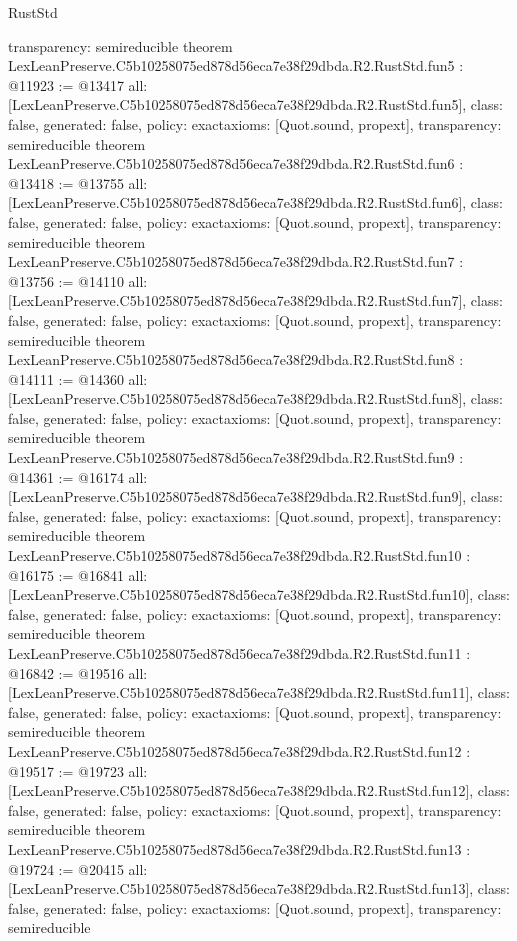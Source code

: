 \begin{lexlean}{RustStd}
\begin{coremodule}
{  transparency: semireducible
}
theorem LexLeanPreserve.C5b10258075ed878d56eca7e38f29dbda.R2.RustStd.fun5 : @11923 := @13417 {
  all: [LexLeanPreserve.C5b10258075ed878d56eca7e38f29dbda.R2.RustStd.fun5],
  class: false,
  generated: false,
  policy: exact{axioms: [Quot.sound, propext]},
  transparency: semireducible
}
theorem LexLeanPreserve.C5b10258075ed878d56eca7e38f29dbda.R2.RustStd.fun6 : @13418 := @13755 {
  all: [LexLeanPreserve.C5b10258075ed878d56eca7e38f29dbda.R2.RustStd.fun6],
  class: false,
  generated: false,
  policy: exact{axioms: [Quot.sound, propext]},
  transparency: semireducible
}
theorem LexLeanPreserve.C5b10258075ed878d56eca7e38f29dbda.R2.RustStd.fun7 : @13756 := @14110 {
  all: [LexLeanPreserve.C5b10258075ed878d56eca7e38f29dbda.R2.RustStd.fun7],
  class: false,
  generated: false,
  policy: exact{axioms: [Quot.sound, propext]},
  transparency: semireducible
}
theorem LexLeanPreserve.C5b10258075ed878d56eca7e38f29dbda.R2.RustStd.fun8 : @14111 := @14360 {
  all: [LexLeanPreserve.C5b10258075ed878d56eca7e38f29dbda.R2.RustStd.fun8],
  class: false,
  generated: false,
  policy: exact{axioms: [Quot.sound, propext]},
  transparency: semireducible
}
theorem LexLeanPreserve.C5b10258075ed878d56eca7e38f29dbda.R2.RustStd.fun9 : @14361 := @16174 {
  all: [LexLeanPreserve.C5b10258075ed878d56eca7e38f29dbda.R2.RustStd.fun9],
  class: false,
  generated: false,
  policy: exact{axioms: [Quot.sound, propext]},
  transparency: semireducible
}
theorem LexLeanPreserve.C5b10258075ed878d56eca7e38f29dbda.R2.RustStd.fun10 : @16175 := @16841 {
  all: [LexLeanPreserve.C5b10258075ed878d56eca7e38f29dbda.R2.RustStd.fun10],
  class: false,
  generated: false,
  policy: exact{axioms: [Quot.sound, propext]},
  transparency: semireducible
}
theorem LexLeanPreserve.C5b10258075ed878d56eca7e38f29dbda.R2.RustStd.fun11 : @16842 := @19516 {
  all: [LexLeanPreserve.C5b10258075ed878d56eca7e38f29dbda.R2.RustStd.fun11],
  class: false,
  generated: false,
  policy: exact{axioms: [Quot.sound, propext]},
  transparency: semireducible
}
theorem LexLeanPreserve.C5b10258075ed878d56eca7e38f29dbda.R2.RustStd.fun12 : @19517 := @19723 {
  all: [LexLeanPreserve.C5b10258075ed878d56eca7e38f29dbda.R2.RustStd.fun12],
  class: false,
  generated: false,
  policy: exact{axioms: [Quot.sound, propext]},
  transparency: semireducible
}
theorem LexLeanPreserve.C5b10258075ed878d56eca7e38f29dbda.R2.RustStd.fun13 : @19724 := @20415 {
  all: [LexLeanPreserve.C5b10258075ed878d56eca7e38f29dbda.R2.RustStd.fun13],
  class: false,
  generated: false,
  policy: exact{axioms: [Quot.sound, propext]},
  transparency: semireducible
}
\end{coremodule}
\end{lexlean}
